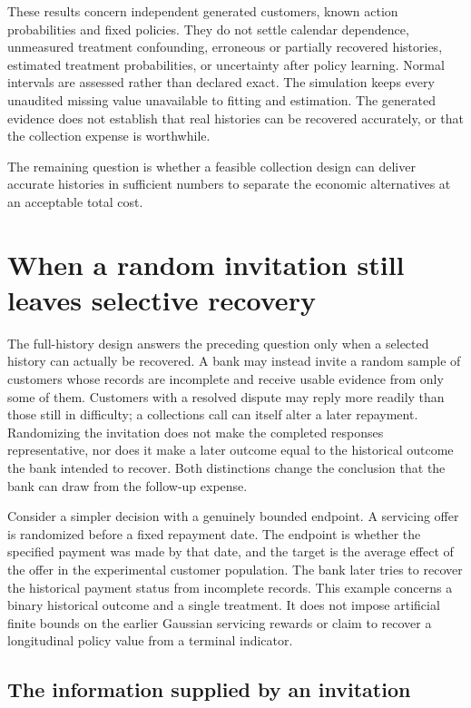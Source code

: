 These results concern independent generated customers, known action
probabilities and fixed policies. They do not settle calendar dependence,
unmeasured treatment confounding, erroneous or partially recovered histories,
estimated treatment probabilities, or uncertainty after policy learning.
Normal intervals are assessed rather than declared exact. The simulation
keeps every unaudited missing value unavailable to fitting and estimation.
The generated evidence does not establish that real histories can be
recovered accurately, or that the collection expense is worthwhile.

The remaining question is whether a feasible collection design can deliver
accurate histories in sufficient numbers to separate the economic
alternatives at an acceptable total cost.

\section{When a random invitation still leaves selective recovery}
\label{rel73:partial-recovery}

The full-history design answers the preceding question only when a selected
history can actually be recovered. A bank may instead invite a random sample
of customers whose records are incomplete and receive usable evidence from
only some of them. Customers with a resolved dispute may reply more readily
than those still in difficulty; a collections call can itself alter a later
repayment. Randomizing the invitation does not make the completed responses
representative, nor does it make a later outcome equal to the historical
outcome the bank intended to recover. Both distinctions change the conclusion
that the bank can draw from the follow-up expense.

Consider a simpler decision with a genuinely bounded endpoint. A servicing
offer is randomized before a fixed repayment date. The endpoint is whether
the specified payment was made by that date, and the target is the average
effect of the offer in the experimental customer population. The bank later
tries to recover the historical payment status from incomplete records. This
example concerns a binary historical outcome and a single treatment. It does
not impose artificial finite bounds on the earlier Gaussian servicing rewards
or claim to recover a longitudinal policy value from a terminal indicator.

\subsection{The information supplied by an invitation}

